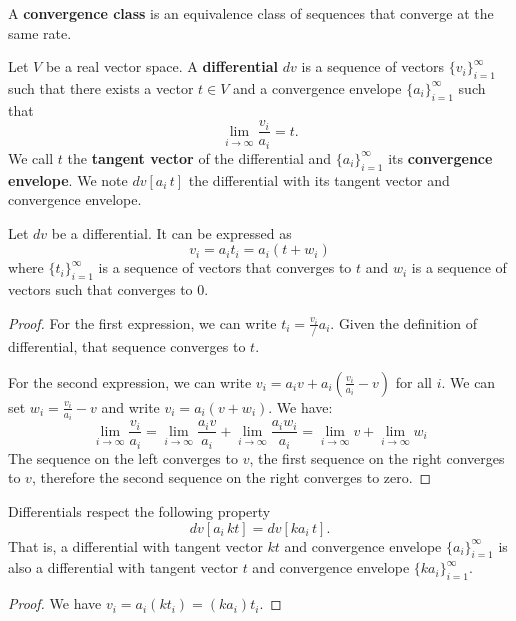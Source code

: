 \begin{defn}
	A \textbf{convergence class} is an equivalence class of sequences that converge at the same rate.
\end{defn}
\fi

\begin{defn}
	Let $V$ be a real vector space. A \textbf{differential} $dv$ is a sequence of vectors $\{v_i\}_{i=1}^{\infty}$ such that there exists a vector $t \in V$ and a convergence envelope $\{a_i\}_{i=1}^{\infty}$ such that 
	$$ \lim\limits_{i \to \infty} \frac{v_i}{a_i} = t.$$
	We call $t$ the \textbf{tangent vector} of the differential and $\{a_i\}_{i=1}^{\infty}$ its \textbf{convergence envelope}. We note $dv[a_i \, t]$ the differential with its tangent vector and convergence envelope.
\end{defn}

\begin{prop}
	Let $dv$ be a differential. It can be expressed as
	$$ v_i = a_i t_i = a_i(t + w_i)$$
	where $\{t_i\}_{i=1}^{\infty}$ is a sequence of vectors that converges to $t$ and $w_i$ is a sequence of vectors such that converges to $0$.
\end{prop}

\begin{proof}
For the first expression, we can write $t_i = \frac{v_i}/{a_i}$. Given the definition of differential, that sequence converges to $t$.	
	
For the second expression, we can write $v_i = a_i v + a_i \left( \frac{v_i}{a_i} - v\right)$ for all $i$. We can set $w_i = \frac{v_i}{a_i} - v$ and write $v_i = a_i(v + w_i)$. We have:
$$\lim\limits_{i \to \infty} \frac{v_i}{a_i} = \lim\limits_{i \to \infty} \frac{a_i v}{a_i} + \lim\limits_{i \to \infty} \frac{a_i w_i}{a_i} = \lim\limits_{i \to \infty} v + \lim\limits_{i \to \infty} w_i$$
The sequence on the left converges to $v$, the first sequence on the right converges to $v$, therefore the second sequence on the right converges to zero.
\end{proof}

\begin{prop}
	Differentials respect the following property
	$$ dv[a_i \, kt] = dv[k a_i \, t].$$
	That is, a differential with tangent vector $kt$ and convergence envelope $\{a_i\}_{i=1}^{\infty}$ is also a differential with tangent vector $t$ and convergence envelope $\{ka_i\}_{i=1}^{\infty}$.
\end{prop}

\begin{proof}
	We have $v_i = a_i (k t_i) = (k a_i) t_i$.
\end{proof}

